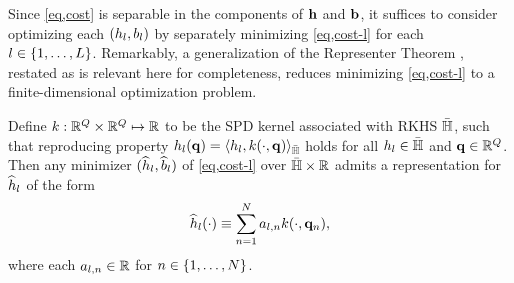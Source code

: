 Since \eqref{eq,cost} is separable 
in the components of $\mathbf{h}$ and $\mathbf{b}$, 
it suffices to consider optimizing each $\paren{h_l,b_l}$ 
by separately minimizing \eqref{eq,cost-l} 
for each $l \in \set{1,\dots,L}$.
Remarkably,
a generalization of the Representer Theorem \cite{scholkopf:01:agr},
restated as is relevant here for completeness,
reduces minimizing \eqref{eq,cost-l} 
to a finite-dimensional optimization problem.
\begin{thm}
	Define $k : \mathbb{R}^{Q} \times \mathbb{R}^{Q} \mapsto \mathbb{R}$
	to be the SPD kernel 
	associated with RKHS ${\bar{\mathbb{H}}}$, 
	such that reproducing property $h_l(\mathbf{q}) = \langle h_l,k(\cdot,\mathbf{q}) \rangle_{\bar{\mathbb{H}}}$
	holds for all $h_l \in {\bar{\mathbb{H}}}$ and $\mathbf{q} \in \mathbb{R}^{Q}$. 
	Then any minimizer $(\widehat{h}_l,\widehat{b}_l)$ of \eqref{eq,cost-l}
	over ${\bar{\mathbb{H}}} \times \mathbb{R}$
	admits a representation for $\widehat{h}_l$ of the form
	\label{thm,rep}
	\begin{align}
		\widehat{h}_l(\cdot) \equiv \sum_{n=1}^N a_{l,n} k(\cdot,\mathbf{q}_{n}),
		\label{eq,rep}
	\end{align}
	where each $a_{l,n} \in \mathbb{R}$ for $n \in \set{1,\dots,N}$.
\end{thm}

